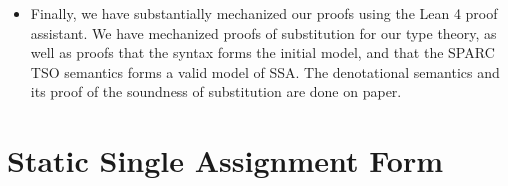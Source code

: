 \documentclass[acmsmall,screen,review]{acmart}
\newcounter{todos}
\newcommand{\TODO}[1]{{
  \stepcounter{todos}
  \begin{center}\large{\textcolor{red}{\textbf{TODO \arabic{todos}:} #1}}\end{center}
}}
\newcommand{\ms}[1]{\ensuremath{\mathsf{#1}}}
\newcommand{\isotopessa}{\(\lambda_{\ms{SSA}}\)}
\begin{document}
\begin{itemize}
\item Finally, we have substantially mechanized our proofs using the Lean 4 proof assistant. We have
  mechanized proofs of substitution for our type theory, as well as proofs that the syntax forms the
  initial model, and that the SPARC TSO semantics forms a valid model of SSA. The denotational
  semantics and its proof of the soundness of substitution are done on paper. 

\end{itemize}



\section{Static Single Assignment Form}

\end{document}
